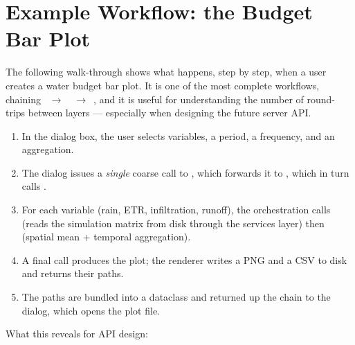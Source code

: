 \section{Example Workflow: the Budget Bar Plot}
\label{sec-example-workflow}

The following walk-through shows what happens, step by step, when a user creates a water budget bar plot. It is one of the most complete workflows, chaining ~$\rightarrow$~~$\rightarrow$~, and it is useful for understanding the number of round-trips between layers --- especially when designing the future server API.

\begin{enumerate}
    \item In the  dialog box, the user selects variables, a period, a frequency, and an aggregation.
    \item The dialog issues a \emph{single} coarse call to , which forwards it to , which in turn calls .
    \item For each variable (rain, ETR, infiltration, runoff), the orchestration calls  (reads the simulation matrix from disk through the services layer) then  (spatial mean + temporal aggregation).
    \item A final  call produces the plot; the renderer writes a PNG and a CSV to disk and returns their paths.
    \item The paths are bundled into a  dataclass and returned up the chain to the dialog, which opens the plot file.
\end{enumerate}

What this reveals for API design:

